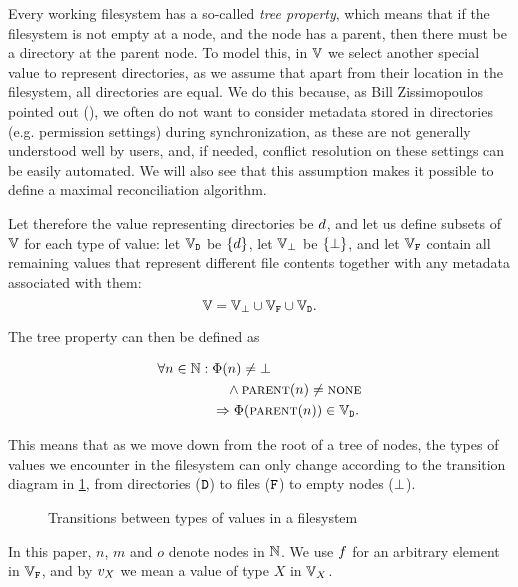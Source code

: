 Every working filesystem has a so-called \emph{tree property}, which means that
if the filesystem is not empty at a node, and the node has a parent,
then there must be a directory at the parent node.
To model this, in $\mathbb{V}$ we select another special value
to represent directories, as we assume that apart from their location
in the filesystem, all directories are equal.
We do this because, as Bill Zissimopoulos pointed 
out (\cite{BZ}),
we often do not want to consider metadata stored in
directories (e.g. permission settings) during synchronization,
as these are not generally understood well by users,
and, if needed, conflict resolution on these settings can be easily automated.
We will also see that this assumption makes it possible
to define a maximal reconciliation algorithm.

Let therefore the value representing directories be $d$,
and let us define subsets of $\mathbb{V}$ for each type of value:
let $\mathbb{V}_{\mathtt{D}}$ be $\{d\}$, let $\mathbb{V}_{\bot}$ be $\{\bot\}$, 
and let $\mathbb{V}_{\mathtt{F}}$ contain all remaining values that represent
different file contents together with any metadata associated with them:
\[ \mathbb{V} = \mathbb{V}_{\bot} \cup \mathbb{V}_{\mathtt{F}} \cup \mathbb{V}_{\mathtt{D}}. \]

The tree property can then be defined as
\begin{mydef}
\begin{align*}
\forall n\in\mathbb{N}:{} &\Phi(n) \neq \bot \\
&\quad\wedge \text{\normalfont\scshape{parent}}(n) \neq \text{\normalfont\scshape{none}} \\
&\Rightarrow \Phi(\text{\normalfont\scshape{parent}}(n)) \in \mathbb{V}_{\mathtt{D}}. 
\end{align*}
\end{mydef}
This means that as we move down from the root of a tree of nodes,
the types of values we encounter in the filesystem can only change according to the
transition diagram in \cref{fig_transition}, from directories ($\mathtt{D}$) to files ($\mathtt{F}$)
to empty nodes ($\bot$).

\begin{figure}[htb]

\caption{Transitions between types of values in a filesystem}\label{fig_transition}
\end{figure}

In this paper, $n$, $m$ and $o$ denote nodes in $\mathbb{N}$.
We use $f$ for an arbitrary element in $\mathbb{V}_{\mathtt{F}}$, 
and by $v_X$ we mean a value of type $X$ in $\mathbb{V}_{X}$.

